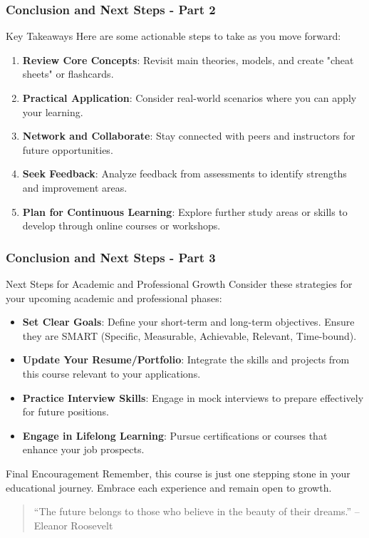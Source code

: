 \documentclass{beamer}
\begin{document}
\begin{frame}[fragile]
    \frametitle{Conclusion and Next Steps - Part 2}
    \begin{block}{Key Takeaways}
        Here are some actionable steps to take as you move forward:
    \end{block}
    \begin{enumerate}
        \item \textbf{Review Core Concepts}: Revisit main theories, models, and create "cheat sheets" or flashcards.
        \item \textbf{Practical Application}: Consider real-world scenarios where you can apply your learning.
        \item \textbf{Network and Collaborate}: Stay connected with peers and instructors for future opportunities.
        \item \textbf{Seek Feedback}: Analyze feedback from assessments to identify strengths and improvement areas.
        \item \textbf{Plan for Continuous Learning}: Explore further study areas or skills to develop through online courses or workshops.
    \end{enumerate}
\end{frame}

\begin{frame}[fragile]
    \frametitle{Conclusion and Next Steps - Part 3}
    \begin{block}{Next Steps for Academic and Professional Growth}
        Consider these strategies for your upcoming academic and professional phases:
    \end{block}
    \begin{itemize}
        \item \textbf{Set Clear Goals}: Define your short-term and long-term objectives. Ensure they are SMART (Specific, Measurable, Achievable, Relevant, Time-bound).
        \item \textbf{Update Your Resume/Portfolio}: Integrate the skills and projects from this course relevant to your applications.
        \item \textbf{Practice Interview Skills}: Engage in mock interviews to prepare effectively for future positions.
        \item \textbf{Engage in Lifelong Learning}: Pursue certifications or courses that enhance your job prospects.
    \end{itemize}
    \begin{block}{Final Encouragement}
        Remember, this course is just one stepping stone in your educational journey. Embrace each experience and remain open to growth.
        \begin{quote}
            “The future belongs to those who believe in the beauty of their dreams.” – Eleanor Roosevelt
        \end{quote}
    \end{block}
\end{frame}
\end{document}
